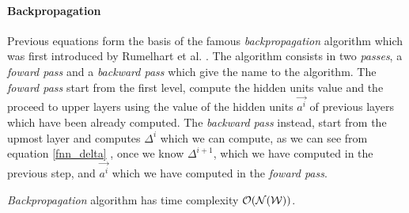 \paragraph{Backpropagation}

Previous equations form the basis of the famous \textit{backpropagation} algorithm which was first introduced by Rumelhart et al. \cite{Rumelhart86}.
The algorithm consists in two \textit{passes}, a \textit{foward pass} and a \textit{backward pass} which give the name to the algorithm.
The \textit{foward pass} start from the first level, compute the hidden units value and the proceed to upper layers using the value of the hidden units 
$\vec{a^i}$ of previous layers which have been already computed. The \textit{backward pass} instead, start from the upmost layer and computes $\Delta^{i}$
which we can compute, as we can see from equation \ref{fnn_delta} , once we know $\Delta^{i+1}$, which we have computed in the previous step, and $\vec{a^i}$ which
we have computed in the \textit{foward pass}.

\textit{Backpropagation} algorithm has time complexity $\mathcal{O}(\mathcal{N}(\mathcal{W}))$.


